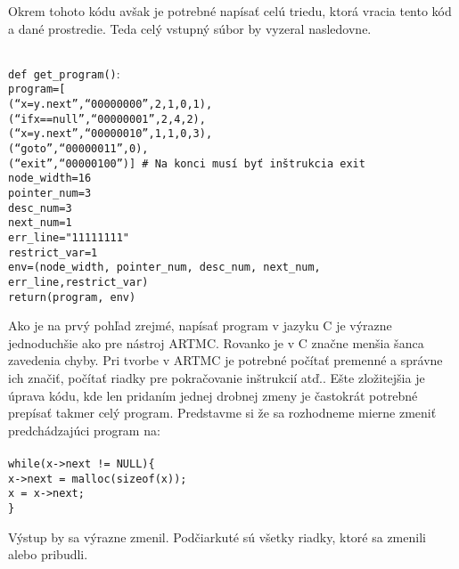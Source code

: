 Okrem tohoto kódu avšak je potrebné napísať celú triedu, ktorá vracia tento kód a dané prostredie.
Teda celý vstupný súbor by vyzeral nasledovne.


\texttt{
\\
def get\_program()$\colon$\\
\tab program=[\\
\tab \tab (``x=y.next'',``00000000'',2,1,0,1),\\
\tab \tab (``ifx==null'',``00000001'',2,4,2),\\
\tab \tab (``x=y.next'',``00000010'',1,1,0,3),\\
\tab \tab (``goto'',``00000011'',0),\\
\tab \tab (``exit'',``00000100'')]   \# Na konci musí byť inštrukcia exit\\
\tab node\_width=16\\
\tab pointer\_num=3\\
\tab desc\_num=3\\
\tab next\_num=1\\
\tab err\_line="11111111"\\
\tab restrict\_var=1\\
\tab env=(node\_width, pointer\_num, desc\_num, next\_num, err\_line,restrict\_var)\\
\tab return(program, env)
}

Ako je na prvý pohľad zrejmé, napísať program v jazyku C je výrazne jednoduchšie ako pre nástroj ARTMC. Rovanko je v C značne menšia šanca zavedenia chyby. Pri tvorbe v ARTMC je potrebné počítať premenné a správne ich značiť, počítať riadky pre pokračovanie inštrukcií atď.. Ešte zložitejšia je úprava kódu, kde len pridaním jednej drobnej zmeny je častokrát potrebné prepísať takmer celý program. Predstavme si že sa rozhodneme mierne zmeniť predchádzajúci program na:\\
\noindent
\texttt{
\\
while(x->next != NULL)\{\\
\tab x->next = malloc(sizeof(x));\\
\tab x = x->next;\\
\}
\\
}

Výstup by sa výrazne zmenil. Podčiarkuté sú všetky riadky, ktoré sa zmenili alebo pribudli.


